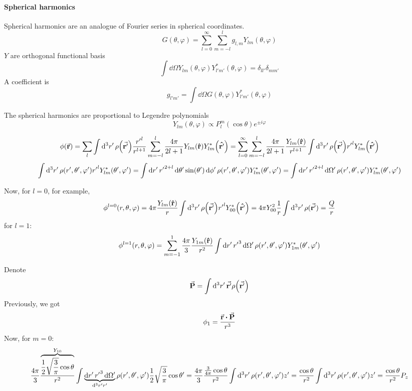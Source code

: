 \paragraph{Spherical harmonics}
Spherical harmonics are an analogue of Fourier series in spherical coordinates.
$$G(\theta, \varphi) = \sum_{l=0}^\infty \sum_{m=-l}^{l} g_{l,m} Y_{lm}(\theta, \varphi)$$
$Y$ are orthogonal functional basis
$$\int \dd{\Omega} Y_{lm} (\theta, \varphi) Y^{*}_{l'm'} (\theta, \varphi) = \delta_{ll'}\delta_{mm'} $$
A coefficient is
$$g_{l'm'} = \int  \dd{\Omega} G(\theta, \varphi) Y^{*}_{l'm'} (\theta, \varphi)  $$

The spherical harmonics are proportional to Legendre polynomials
$$Y_{lm}(\theta, \varphi) \propto P_{l}^m (\cos \theta) e^{\pm i \varphi}$$

$$\phi\qty(\va{r}) = \sum_l\int \dd[3]{r'} \rho\qty(\va{r'}) \frac{{r'}^l}{{r}^{l+1}} \sum_{m=-l}^l  \frac{4\pi}{2l+1}Y_{lm}\qty(\vu{r})Y^*_{lm}\qty(\vu{r'}) = \sum_{l=0}^\infty \sum_{m=-l}^l \frac{4\pi}{2l+1}  \frac{ Y_{lm}\qty(\vu{r})}{{r}^{l+1}} \int \dd[3]{r'} \rho\qty(\va{r'}) {r'}^l  Y^*_{lm}\qty(\vu{r'})$$
$$\int \dd[3]{r'} \rho\qty(r',\theta',\varphi') {r'}^l   Y^*_{lm}\qty(\theta',\varphi') = \int \dd{r'} {r'}^{2+l} \dd{\theta'} \sin(\theta') \dd{\phi'} \rho\qty(r',\theta',\varphi')  Y^*_{lm}\qty(\theta',\varphi') = \int \dd{r'} {r'}^{2+l} \dd{\Omega'}  \rho\qty(r',\theta',\varphi')  Y^*_{lm}\qty(\theta',\varphi')$$

Now, for $l=0$, for example, 
$$\phi^{l=0}(r,\theta , \varphi) = 4\pi  \frac{ Y_{lm}\qty(\vu{r})}{r} \int \dd[3]{r'} \rho\qty(\va{r'}) {r'}^l  Y^*_{00}\qty(\vu{r'}) = 4\pi Y_{00}^2 \frac{1}{r} \int \dd[3]{r'} \rho(\va{r'}) = \frac{Q}{r}$$
for $l=1$:
$$\phi^{l=1}(r,\theta , \varphi) =\sum_{m=-1}^1 \frac{4\pi}{3}  \frac{ Y_{1m}\qty(\vu{r})}{r^2} \int \dd{r'} {r'}^{3} \dd{\Omega'}  \rho\qty(r',\theta',\varphi')  Y^*_{1m}\qty(\theta',\varphi')$$

Denote 
$$\va{P} = \int \dd[3]{r'} \va{r'} \rho\qty(\va{r'}) $$
Previously, we got
$$\phi_1 = \frac{\va{r} \vdot \va{P}}{r^3}$$
Now, for $m=0$:
$$ \frac{4\pi}{3}  \frac{ \overbrace{\frac{1}{2}\sqrt{\frac{3}{\pi}} \cos \theta}^{Y_{10}}}{r^2} \int \underbrace{\dd{r'} {r'}^{3} \dd{\Omega'} }_{\dd[3]{r'} r'} \rho\qty(r',\theta',\varphi') \frac{1}{2}\sqrt{\frac{3}{\pi}} \cos \theta' = \frac{4\pi}{3}\frac{\frac{3}{4\pi} \cos \theta}{r^2} \int \dd[3]{r'} \rho\qty(r',\theta',\varphi') z' =  \frac{\cos \theta}{r^2} \int \dd[3]{r'} \rho\qty(r',\theta',\varphi') z' = \frac{\cos \theta}{r^2}P_z$$


